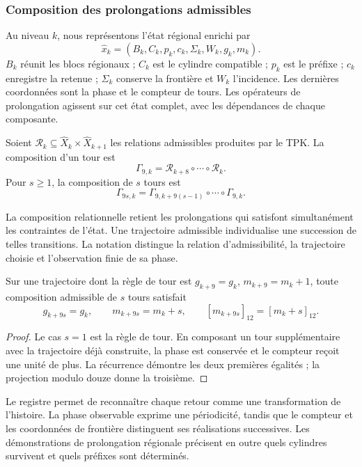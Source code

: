 \subsubsection{Composition des prolongations admissibles}

Au niveau $k$, nous représentons l’état régional enrichi par
\[
 \widehat x_k=(B_k,C_k,p_k,c_k,\Sigma_k,W_k,g_k,m_k).
\]
$B_k$ réunit les blocs régionaux ; $C_k$ est le cylindre compatible ;
$p_k$ est le préfixe ; $c_k$ enregistre la retenue ; $\Sigma_k$ conserve la
frontière et $W_k$ l’incidence. Les dernières coordonnées sont la phase et
le compteur de tours. Les opérateurs de prolongation agissent sur
cet état complet, avec les dépendances de chaque composante.

\begin{definicion}
Soient $\mathcal R_k\subseteq\widehat X_k\times\widehat X_{k+1}$
les relations admissibles produites par le TPK. La composition d’un
tour est
\[
 \Gamma_{9,k}=\mathcal R_{k+8}\circ\cdots\circ\mathcal R_k.
\]
Pour $s\geq1$, la composition de $s$ tours est
\[
 \Gamma_{9s,k}=
 \Gamma_{9,k+9(s-1)}\circ\cdots\circ\Gamma_{9,k}.
\]
\end{definicion}

La composition relationnelle retient les prolongations qui satisfont
simultanément les contraintes de l’état. Une trajectoire admissible
individualise une succession de telles transitions. La notation distingue
la relation d’admissibilité, la trajectoire choisie et l’observation
finie de sa phase.

\begin{proposicion}
\label{prop:cal-memoria}
Sur une trajectoire dont la règle de tour est
$g_{k+9}=g_k$, $m_{k+9}=m_k+1$, toute composition admissible de $s$
tours satisfait
\[
 g_{k+9s}=g_k,\qquad m_{k+9s}=m_k+s,
 \qquad [m_{k+9s}]_{12}=[m_k+s]_{12}.
\]
\end{proposicion}
\begin{proof}
Le cas $s=1$ est la règle de tour. En composant un tour supplémentaire
avec la trajectoire déjà construite, la phase est conservée et le compteur
reçoit une unité de plus. La récurrence démontre les deux premières égalités ;
la projection modulo douze donne la troisième.
\end{proof}

Le registre permet de reconnaître chaque retour comme une transformation de
l’histoire. La phase observable exprime une périodicité, tandis que
le compteur et les coordonnées de frontière distinguent ses réalisations
successives. Les démonstrations de prolongation régionale précisent
en outre quels cylindres survivent et quels préfixes sont déterminés.

